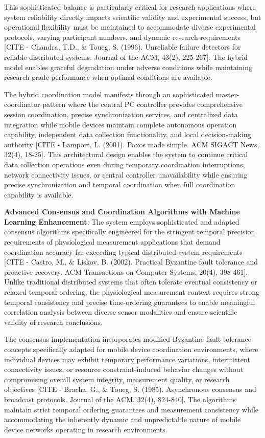 \documentclass[12pt,a4paper]{article}
\begin{document}
This sophisticated balance is particularly critical for research applications where system reliability directly impacts
scientific validity and experimental success, but operational flexibility must be maintained to accommodate diverse
experimental protocols, varying participant numbers, and dynamic research
requirements [CITE - Chandra, T.D., \& Toueg, S. (1996). Unreliable failure detectors for reliable distributed systems. Journal of the ACM, 43(2), 225-267].
The hybrid model enables graceful degradation under adverse conditions while maintaining research-grade performance when
optimal conditions are available.

The hybrid coordination model manifests through an sophisticated master-coordinator pattern where the central PC
controller provides comprehensive session coordination, precise synchronization services, and centralized data
integration while mobile devices maintain complete autonomous operation capability, independent data collection
functionality, and local decision-making
authority [CITE - Lamport, L. (2001). Paxos made simple. ACM SIGACT News, 32(4), 18-25]. This architectural design
enables the system to continue critical data collection operations even during temporary coordination interruptions,
network connectivity issues, or central controller unavailability while ensuring precise synchronization and temporal
coordination when full coordination capability is available.

\textbf{Advanced Consensus and Coordination Algorithms with Machine Learning Enhancement}: The system employs sophisticated
and adapted consensus algorithms specifically engineered for the stringent temporal precision requirements of
physiological measurement applications that demand coordination accuracy far exceeding typical distributed system
requirements [CITE - Castro, M., \& Liskov, B. (2002). Practical Byzantine fault tolerance and proactive recovery. ACM Transactions on Computer Systems, 20(4), 398-461].
Unlike traditional distributed systems that often tolerate eventual consistency or relaxed temporal ordering, the
physiological measurement context requires strong temporal consistency and precise time-ordering guarantees to enable
meaningful correlation analysis between diverse sensor modalities and ensure scientific validity of research
conclusions.

The consensus implementation incorporates modified Byzantine fault tolerance concepts specifically adapted for mobile
device coordination environments, where individual devices may exhibit temporary performance variations, intermittent
connectivity issues, or resource constraint-induced behavior changes without compromising overall system integrity,
measurement quality, or research
objectives [CITE - Bracha, G., \& Toueg, S. (1985). Asynchronous consensus and broadcast protocols. Journal of the ACM, 32(4), 824-840].
The algorithms maintain strict temporal ordering guarantees and measurement consistency while accommodating the
inherently dynamic and unpredictable nature of mobile device networks operating in research environments.
\end{document}
